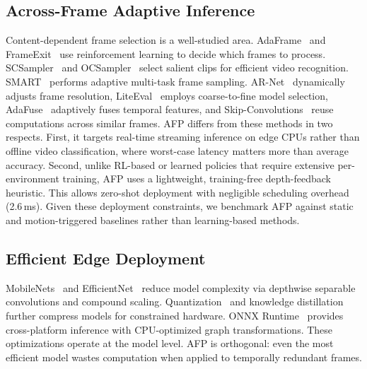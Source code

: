 \documentclass[conference]{IEEEtran}
\begin{document}
\subsection{Across-Frame Adaptive Inference}

Content-dependent frame selection is a well-studied area.
AdaFrame~\cite{wu2019adaframe} and
FrameExit~\cite{ghodrati2021frameexit} use reinforcement learning
to decide which frames to process.
SCSampler~\cite{korbar2019scsampler} and
OCSampler~\cite{xie2021ocsampler} select salient clips for
efficient video recognition.
SMART~\cite{smart2020smart} performs adaptive multi-task frame
sampling. AR-Net~\cite{meng2020arnet} dynamically adjusts frame
resolution, LiteEval~\cite{qi2019liteeval} employs coarse-to-fine
model selection, AdaFuse~\cite{han2021adafuse} adaptively fuses
temporal features, and
Skip-Convolutions~\cite{habibian2021skip} reuse computations across
similar frames. AFP differs from these methods in two respects.
First, it targets real-time streaming inference on edge CPUs rather
than offline video classification, where worst-case latency matters
more than average accuracy. Second, unlike RL-based or learned policies
that require extensive per-environment training, AFP uses a lightweight,
training-free depth-feedback heuristic. This allows zero-shot deployment
with negligible scheduling overhead (2.6\,ms). Given these deployment constraints, we benchmark AFP against static and motion-triggered baselines rather than learning-based methods.

\subsection{Efficient Edge Deployment}

MobileNets~\cite{howard2017mobilenets} and
EfficientNet~\cite{tan2019efficientnet} reduce model complexity via
depthwise separable convolutions and compound scaling.
Quantization~\cite{jacob2018quantization} and knowledge
distillation~\cite{hinton2015distilling} further compress models for
constrained hardware. ONNX Runtime~\cite{onnxruntime2019} provides
cross-platform inference with CPU-optimized graph transformations.
These optimizations operate at the model level. AFP is orthogonal:
even the most efficient model wastes computation when applied to
temporally redundant frames.

\end{document}
